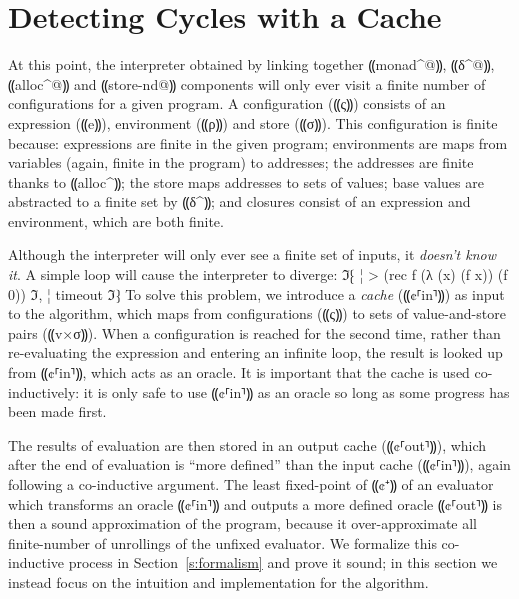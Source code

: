 \section{Detecting Cycles with a Cache}\label{s:cache}

At this point, the interpreter obtained by linking together ⸨monad^@⸩, ⸨δ^@⸩,
⸨alloc^@⸩ and ⸨store-nd@⸩ components will only ever visit a finite number of
configurations for a given program. A configuration (⸨ς⸩) consists of an
expression (⸨e⸩), environment (⸨ρ⸩) and store (⸨σ⸩). This configuration is
finite because: expressions are finite in the given program; environments are
maps from variables (again, finite in the program) to addresses; the addresses
are finite thanks to ⸨alloc^⸩; the store maps addresses to sets of values; base
values are abstracted to a finite set by ⸨δ^⸩; and closures consist of an
expression and environment, which are both finite.

Although the interpreter will only ever see a finite set of inputs, it
\emph{doesn't know it}.  A simple loop will cause the interpreter to diverge:
ℑ⁅
¦ > (rec f (λ (x) (f x)) (f 0))
ℑ,
¦ timeout
ℑ⁆
To solve this problem, we introduce a \emph{cache} (⸨¢⸢in⸣⸩) as input to the
algorithm, which maps from configurations (⸨ς⸩) to sets of value-and-store
pairs (⸨v×σ⸩). When a configuration is reached for the second time, rather than
re-evaluating the expression and entering an infinite loop, the result is
looked up from ⸨¢⸢in⸣⸩, which acts as an oracle. It is important that the cache
is used co-inductively: it is only safe to use ⸨¢⸢in⸣⸩ as an oracle so long as
some progress has been made first. 

The results of evaluation are then stored in an output cache (⸨¢⸢out⸣⸩), which
after the end of evaluation is “more defined” than the input cache (⸨¢⸢in⸣⸩),
again following a co-inductive argument. The least fixed-point of ⸨¢⁺⸩ of an
evaluator which transforms an oracle ⸨¢⸢in⸣⸩ and outputs a more defined oracle
⸨¢⸢out⸣⸩ is then a sound approximation of the program, because it
over-approximate all finite-number of unrollings of the unfixed evaluator. We
formalize this co-inductive process in Section~\ref{s:formalism} and prove it
sound; in this section we instead focus on the intuition and implementation for
the algorithm.


